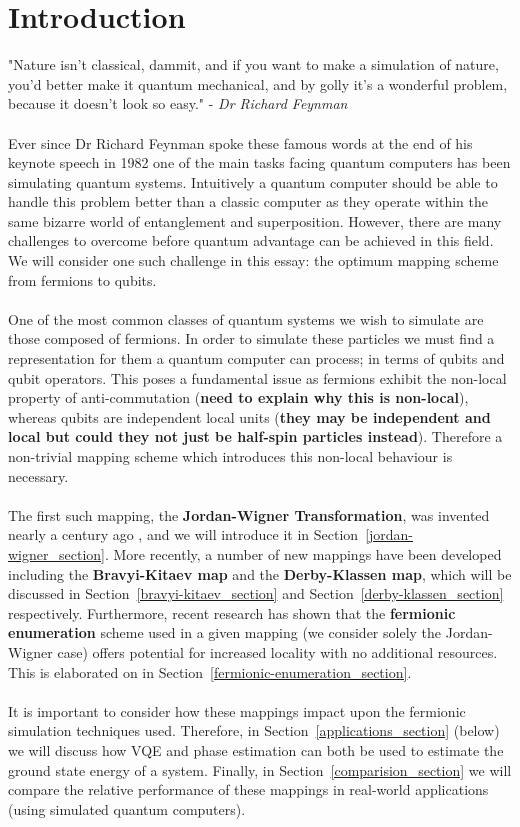 \documentclass[twoside]{article}
\begin{document}
\section{Introduction}
"Nature isn't classical, dammit, and if you want to make a simulation of nature, you'd better make it quantum mechanical, and by golly it's a wonderful problem, because it doesn't look so easy." - \textsl{Dr Richard Feynman} \cite{feynmann}  \\\\
Ever since Dr Richard Feynman spoke these famous words at the end of his keynote speech in 1982 one of the main tasks facing quantum computers has been simulating quantum systems. Intuitively a quantum computer should be able to handle this problem better than a classic computer as they operate within the same bizarre world of entanglement and superposition. However, there are many challenges to overcome before quantum advantage can be achieved in this field. We will consider one such challenge in this essay: the optimum mapping scheme from fermions to qubits.\\\\
One of the most common classes of quantum systems we wish to simulate are those composed of fermions. In order to simulate these particles we must find a representation for them a quantum computer can process; in terms of qubits and qubit operators. This poses a fundamental issue as fermions exhibit the non-local property of anti-commutation (\textbf{need to explain why this is non-local}), whereas qubits are independent local units (\textbf{they may be independent and local but could they not just be half-spin particles instead}). Therefore a non-trivial mapping scheme which introduces this non-local behaviour is necessary.\\\\
The first such mapping, the \textbf{Jordan-Wigner Transformation}, was invented nearly a century ago \cite{originalJordanWigner}, and we will introduce it in Section~\ref{jordan-wigner_section}. More recently, a number of new mappings have been developed including the \textbf{Bravyi-Kitaev map} and the \textbf{Derby-Klassen map}, which will be discussed in Section~\ref{bravyi-kitaev_section} and Section~\ref{derby-klassen_section} respectively. Furthermore, recent research \cite{fermionicEncoding} has shown that the \textbf{fermionic enumeration} scheme used in a given mapping (we consider solely the Jordan-Wigner case) offers potential for increased locality with no additional resources. This is elaborated on in Section~\ref{fermionic-enumeration_section}.\\\\
It is important to consider how these mappings impact upon the fermionic simulation techniques used. Therefore, in Section~\ref{applications_section} (below) we will discuss how VQE and phase estimation can both be used to estimate the ground state energy of a system. Finally,  in Section~\ref{comparision_section} we will compare the relative performance of these mappings in real-world applications (using simulated quantum computers).
\end{document}
